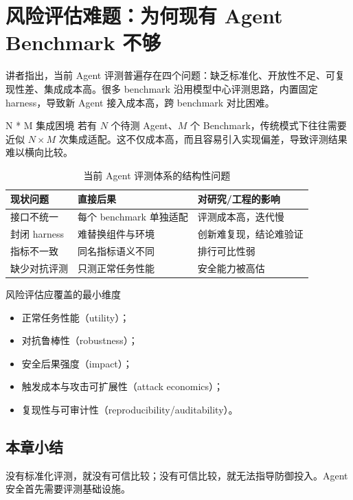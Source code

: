 \documentclass[a4paper]{article}
\begin{document}
\section{风险评估难题：为何现有 Agent Benchmark 不够}

讲者指出，当前 Agent 评测普遍存在四个问题：缺乏标准化、开放性不足、可复现性差、集成成本高。很多 benchmark 沿用模型中心评测思路，内置固定 harness，导致新 Agent 接入成本高，跨 benchmark 对比困难。

\begin{importantbox}{N * M 集成困境}
若有 $N$ 个待测 Agent、$M$ 个 Benchmark，传统模式下往往需要近似 $N \times M$ 次集成适配。这不仅成本高，而且容易引入实现偏差，导致评测结果难以横向比较。
\end{importantbox}

\begin{table}[H]
\centering
\begin{tabular}{p{2.6cm}p{3.8cm}p{4.6cm}}
\toprule
\textbf{现状问题} & \textbf{直接后果} & \textbf{对研究/工程的影响} \\
\midrule
接口不统一 & 每个 benchmark 单独适配 & 评测成本高，迭代慢 \\
封闭 harness & 难替换组件与环境 & 创新难复现，结论难验证 \\
指标不一致 & 同名指标语义不同 & 排行可比性弱 \\
缺少对抗评测 & 只测正常任务性能 & 安全能力被高估 \\
\bottomrule
\end{tabular}
\caption{当前 Agent 评测体系的结构性问题}
\end{table}

\begin{knowledgebox}{风险评估应覆盖的最小维度}
\begin{itemize}
    \item 正常任务性能（utility）；
    \item 对抗鲁棒性（robustness）；
    \item 安全后果强度（impact）；
    \item 触发成本与攻击可扩展性（attack economics）；
    \item 复现性与可审计性（reproducibility/auditability）。
\end{itemize}
\end{knowledgebox}

\subsection{本章小结}
没有标准化评测，就没有可信比较；没有可信比较，就无法指导防御投入。Agent 安全首先需要评测基础设施。
\end{document}
